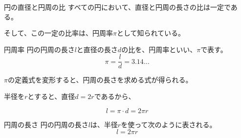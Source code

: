 \documentclass[../../math-imaging]{subfiles}
\begin{document}
\begin{theorem}{円の直径と円周の比}
  すべての円において、直径と円周の長さの比は一定である。
\end{theorem}

そして、この一定の比率は、円周率$\pi$として知られている。

\begin{definition}{円周率}
  円の円周の長さ$l$と直径の長さ$d$の比を、円周率といい、$\pi$で表す。
  \LARGE
  \begin{equation}
    \pi = \dfrac{l}{d} = 3.14\ldots
  \end{equation}
\end{definition}

$\pi$の定義式を変形すると、円周の長さを求める式が得られる。

半径を$r$とすると、直径$d = 2r$であるから、

\begin{equation}
  l = \pi \cdot d = 2\pi r
\end{equation}

\begin{theorem}{円周の長さ}
  円の円周の長さ$l$は、半径$r$を使って次のように表される。
  \LARGE
  \begin{equation}
    l = 2\pi r
  \end{equation}
\end{theorem}
\end{document}
